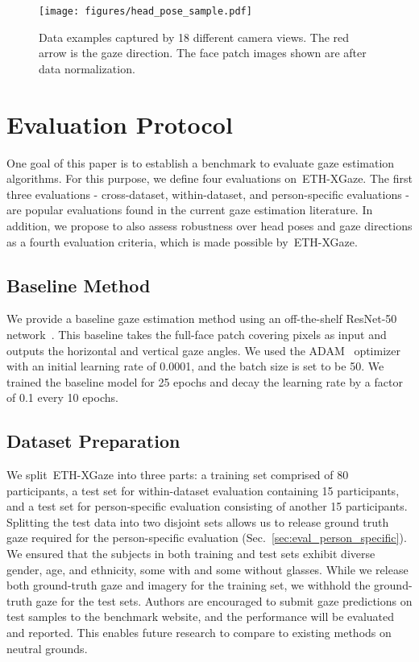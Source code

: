 \documentclass[runningheads]{llncs}
\newcommand{\datasetname}{ETH-XGaze\xspace}
\begin{document}
\begin{figure}[t]
    \centering
    \texttt{[image: figures/head\_pose\_sample.pdf]}
    \caption{Data examples captured by 18 different camera views. The red arrow is the gaze direction. The face patch images shown are after data normalization.}
    \label{fig:head_pose_sample}
\end{figure} \section{Evaluation Protocol}
One goal of this paper is to establish a benchmark to evaluate gaze estimation algorithms.
For this purpose, we define four evaluations on~\datasetname.
The first three evaluations - cross-dataset, within-dataset, and person-specific evaluations - are popular evaluations found in the current gaze estimation literature. In addition, we propose to also assess robustness over head poses and gaze directions as a fourth evaluation criteria, which is made possible by~\datasetname.

\subsection{Baseline Method}
We provide a baseline gaze estimation method using an off-the-shelf ResNet-50 network~\cite{he2016deep}.
This baseline takes the full-face patch covering  pixels as input and outputs the horizontal and vertical gaze angles.
We used the ADAM~\cite{kingma2014adam} optimizer with an initial learning rate of 0.0001, and the batch size is set to be 50.
We trained the baseline model for 25 epochs and decay the learning rate by a factor of 0.1 every 10 epochs.

\subsection{Dataset Preparation}
We split~\datasetname into three parts: a training set  comprised of 80 participants, a test set for within-dataset evaluation  containing 15 participants, and a test set for person-specific evaluation  consisting of another 15 participants. Splitting the test data into two disjoint sets allows us to release ground truth gaze required for the person-specific evaluation (Sec.~\ref{sec:eval_person_specific}).
We ensured that the subjects in both training and test sets exhibit diverse gender, age, and ethnicity, some with and some without glasses. While we release both ground-truth gaze and imagery for the training set, we withhold the ground-truth gaze for the test sets. Authors are encouraged to submit gaze predictions on test samples to the benchmark website, and the performance will be evaluated and reported. This enables future research to compare to existing methods on neutral grounds.
\end{document}
